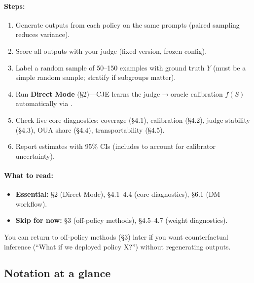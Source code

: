 \paragraph{Steps:}
\begin{enumerate}
\item Generate outputs from each policy on the same prompts (paired sampling reduces variance).
\item Score all outputs with your judge (fixed version, frozen config).
\item Label a random sample of 50--150 examples with ground truth $Y$ (must be a simple random sample; stratify if subgroups matter).
\item Run \textbf{Direct Mode} (§2)---CJE learns the judge$\to$oracle calibration $f(S)$ automatically via \autocal.
\item Check five core diagnostics: coverage (§4.1), calibration (§4.2), judge stability (§4.3), OUA share (§4.4), transportability (§4.5).
\item Report estimates with 95\% CIs (includes \oua{} to account for calibrator uncertainty).
\end{enumerate}

\paragraph{What to read:}
\begin{itemize}
\item \textbf{Essential:} §2 (Direct Mode), §4.1--4.4 (core diagnostics), §6.1 (DM workflow).
\item \textbf{Skip for now:} §3 (off-policy methods), §4.5--4.7 (weight diagnostics).
\end{itemize}

You can return to off-policy methods (§3) later if you want counterfactual inference (``What if we deployed policy X?'') without regenerating outputs.

\subsection{Notation at a glance}


